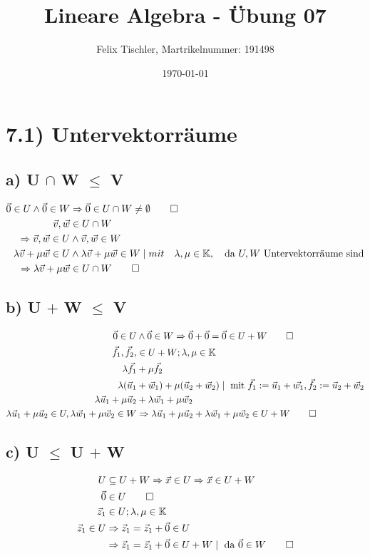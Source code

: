 \documentclass[titlepage]{article}
\newcommand{\K}{\mathbb{K}}
\newcommand{\1}{\mathbb{1}}
\newcommand{\0}{\mathbb{0}}
\begin{document}
	
	\title{Lineare Algebra - Übung 07}
	\author{Felix Tischler, Martrikelnummer: 191498}
	\date{\today}
	\maketitle
	
	\section*{7.1) Untervektorräume}
		\subsection*{a) U $\cap$ W $\le$ V}
			\begin{align*}
				\vec{0}\in U\wedge\vec{0}\in W&\Rightarrow\vec{0}\in U\cap W\neq\emptyset\qed\\
				\vec{v},\vec{w}&\in U\cap W\\
				\Rightarrow\vec{v},\vec{w}\in U&\wedge\vec{v},\vec{w}\in W\\
				\lambda\vec{v}+\mu\vec{w}\in U&\wedge\lambda\vec{v}+\mu\vec{w}\in W\mid mit\quad\lambda,\mu\in\mathbb{K},\quad\text{da $U,W$ Untervektorräume sind}\\
				\Rightarrow\lambda\vec{v}+\mu\vec{w}&\in U\cap W\qed
			\end{align*}
		\subsection*{b) U $+$ W $\le$ V}
			\begin{align*}
				\vec{0}\in U&\wedge\vec{0}\in W\Rightarrow \vec{0}+\vec{0}=\vec{0}\in U+W\qed\\
				\vec{f}_1,\vec{f}_2,&\in U+W;\lambda,\mu\in\K\\
				\lambda\vec{f}_1&+\mu\vec{f}_2\\
				\lambda(\vec{u}_1&+\vec{w}_1)+\mu(\vec{u}_2+\vec{w}_2)\mid\text{ mit } \vec{f}_1:=\vec{u}_1+\vec{w_1},\vec{f}_2:=\vec{u}_2+\vec{w}_2\\
				\lambda\vec{u}_1+\mu\vec{u}_2&+\lambda\vec{w}_1+\mu\vec{w}_2\\
				\lambda\vec{u}_1+\mu\vec{u}_2\in U,\lambda\vec{w}_1+\mu\vec{w}_2\in W &\Rightarrow \lambda\vec{u}_1+\mu\vec{u}_2+\lambda\vec{w}_1+\mu\vec{w}_2\in U+W\qed
			\end{align*}
		\subsection*{c) U $\le$ U $+$ W}
			\begin{align*}
				U&\subseteq U+W\Rightarrow \vec{x}\in U\Rightarrow \vec{x}\in U+W\\
				\vec{0}&\in U\qed\\
				\vec{z}_1&\in U;\lambda,\mu\in\K\\
				\vec{z}_1\in U&\Rightarrow\vec{z}_1=\vec{z}_1+\vec{0}\in U\\
				&\Rightarrow\vec{z}_1=\vec{z}_1+\vec{0}\in U+W\mid\text{ da }\vec{0}\in W\qed
			\end{align*}
\end{document}
